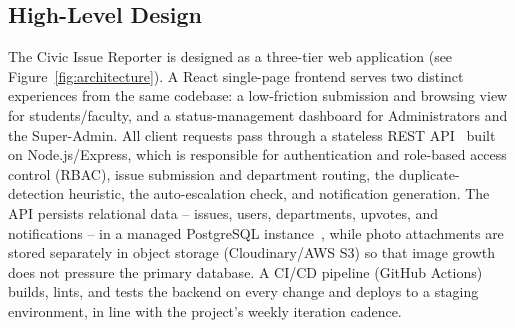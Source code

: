 \documentclass[11pt]{report}
\newcommand{\sysname}{Civic Issue Reporter\xspace}
\begin{document}
\subsection{High-Level Design}

The \sysname is designed as a three-tier web application (see
Figure~\ref{fig:architecture}). A React single-page frontend serves two
distinct experiences from the same codebase: a low-friction submission
and browsing view for students/faculty, and a status-management
dashboard for Administrators and the Super-Admin. All client requests
pass through a stateless REST API~\cite{fielding2000rest} built on
Node.js/Express, which is
responsible for authentication and role-based access control (RBAC),
issue submission and department routing, the duplicate-detection
heuristic, the auto-escalation check, and notification generation. The
API persists relational data -- issues, users, departments, upvotes, and
notifications -- in a managed PostgreSQL instance~\cite{postgresql2024},
while photo
attachments are stored separately in object storage (Cloudinary/AWS S3)
so that image growth does not pressure the primary database. A CI/CD
pipeline (GitHub Actions) builds, lints, and tests the backend on every
change and deploys to a staging environment, in line with the project's
weekly iteration cadence.
\end{document}
